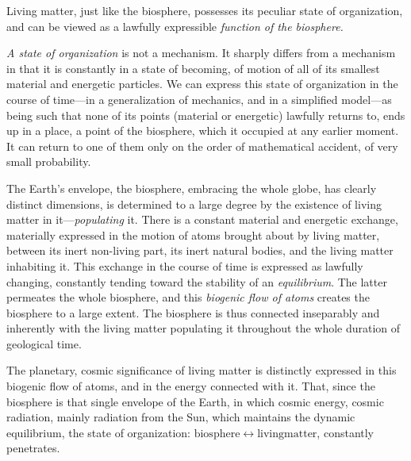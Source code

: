 Living matter, just like the biosphere, possesses its peculiar state of
organization, and can be viewed as a lawfully expressible \emph{function of the
biosphere.}

\emph{A state of organization} is not a mechanism.  It sharply differs from a
mechanism in that it is constantly in a state of
becoming, of motion of
all of its smallest material and energetic particles.  We can express this
state of organization in the course of time---in a generalization of mechanics,
and in a simplified model---as being such that none of its points (material or
energetic) lawfully returns to,  ends up in a place,  a point of the biosphere, which it
occupied at any earlier moment.  It can return to one of them only on the order
of mathematical accident, of very small probability.

The Earth's envelope, the biosphere, embracing the whole globe, has clearly
distinct dimensions,  is determined to a large degree by the
existence of living matter in it---\emph{populating} it.
There is a constant material and energetic exchange, materially expressed in
the motion of atoms brought about by living matter, between its inert
non-living part, its inert natural bodies, and the living matter inhabiting it.
This exchange in the course of time is expressed as lawfully changing,
constantly tending toward the stability of an
\emph{equilibrium}.  The latter permeates the whole
biosphere, and this \emph{biogenic flow of atoms} creates the biosphere to a large extent.  The biosphere is thus
connected inseparably and inherently with the living matter populating it
throughout the whole duration of geological time.

The planetary, cosmic significance of living matter is distinctly expressed in
this biogenic flow of atoms, and in the energy connected with it.  That, since
the biosphere is that single envelope of the Earth, in which cosmic energy,
cosmic radiation, mainly radiation from the Sun, which maintains the dynamic
equilibrium, the state of organization: $\mathrm{biosphere} \leftrightarrow
\mathrm{living matter}$, constantly penetrates.

